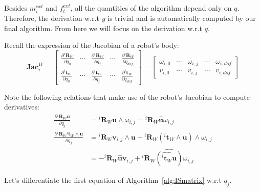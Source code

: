Besides $m_i^{ext}$ and $f_i^{ext}$, all the quantities of the algorithm depend only on $q$.
Therefore, the derivation w.r.t $y$ is trivial and is automatically computed by our final algorithm.
From here we will focus on the derivation w.r.t $q$.

Recall the expression of the Jacobian of a robot's body:
\begin{equation}
  \mathbf{Jac}^W_i =
  \begin{bmatrix}
    \frac{\partial {}^i\mathbf{R}_W}{\partial q_0} & \cdots &
    \frac{\partial {}^i\mathbf{R}_W}{\partial q_j} & \cdots &
    \frac{\partial {}^i\mathbf{R}_W}{\partial q_{dof}} \\
    \frac{\partial {}^i\mathbf{t}_W}{\partial q_0} & \cdots &
    \frac{\partial {}^i\mathbf{t}_W}{\partial q_j} & \cdots &
    \frac{\partial {}^i\mathbf{t}_W}{\partial q_{dof}}
  \end{bmatrix}
=
  \begin{bmatrix}
    \omega_{i,0} & \cdots &
    \omega_{i,j} & \cdots &
    \omega_{i,dof} \\
    v_{i,0} & \cdots &
    v_{i,j} & \cdots &
    v_{i,dof}
  \end{bmatrix}
\end{equation}

Note the following relations that make use of the robot's Jacobian to compute derivatives:
\begin{align}
  \frac{\partial {}^i\mathbf{R}_W \mathbf{u}}{\partial q_j}
  &= {}^i\mathbf{R}_W \mathbf{u} \wedge \omega_{i,j}
  = {}^i\mathbf{R}_W \widehat{\mathbf{u}} \omega_{i,j}
  \\
  \frac{\partial {}^i\mathbf{R}_W {}^i\mathbf{t}_W\wedge \mathbf{u}}{\partial q_j}
  &= {}^i\mathbf{R}_W \mathbf{v}_{i,j} \wedge \mathbf{u}
  + {}^i\mathbf{R}_W \left({}^i\mathbf{t}_W\wedge\mathbf{u}\right) \wedge \omega_{i,j}\\
  &= -{}^i\mathbf{R}_W \widehat{\mathbf{u}} \mathbf{v}_{i,j}
  + {}^i\mathbf{R}_W \widehat{\left(\widehat{{}^i\mathbf{t}_W}\mathbf{u}\right)} \omega_{i,j}
\end{align}

Let's differentiate the first equation of Algorithm~\ref{alg:ISmatrix} w.r.t $q_j$.

